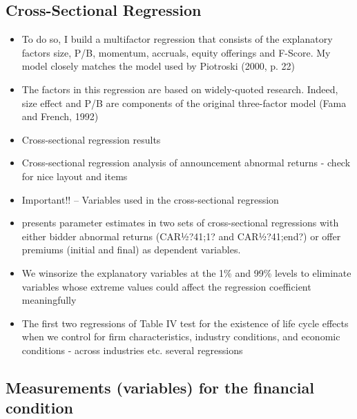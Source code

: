 \documentclass[12pt]{article}
\begin{document}
\subsection{Cross-Sectional Regression}

    \begin{itemize}
        \item To do so, I build a multifactor regression that consists of the explanatory factors size, P/B, momentum, accruals, equity offerings and F-Score. My model closely matches the model used by Piotroski (2000, p. 22) \citep{Mohr2012}

        \item The factors in this regression are based on widely-quoted research. Indeed, size effect and P/B are components of the original three-factor model (Fama and French, 1992) \citep{Mohr2012}

        \item Cross-sectional regression results \citep[p.3094]{Akhigbe2007}

        \item Cross-sectional regression analysis of announcement abnormal returns \citep{Moeller2004} - check for nice layout and items

        \item Important!! -- Variables used in the cross-sectional regression  \citep{Betton2009}

        \item presents parameter estimates in two sets of cross-sectional regressions with either bidder abnormal returns (CAR½?41;1? and CAR½?41;end?) or offer premiums (initial and final) as dependent variables. \citep{Betton2009}

        \item We winsorize the explanatory variables at the 1\% and 99\% levels to eliminate variables whose extreme values could affect the regression coefficient meaningfully \citep{Arikan2016}
        
        \item The first two regressions of Table IV test for the existence of life cycle effects when we control for firm characteristics, industry conditions, and economic conditions \citep{Arikan2016} - across industries etc. several regressions
    \end{itemize}


\subsection{Measurements (variables) for the financial condition} 
    
\end{document}
